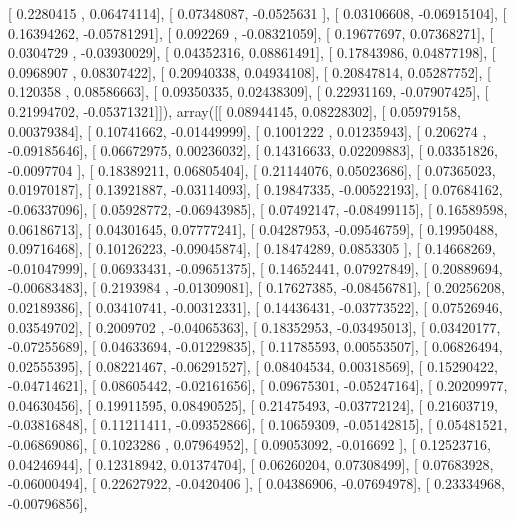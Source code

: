 \documentclass{article}
\begin{document}
       [ 0.2280415 ,  0.06474114],
       [ 0.07348087, -0.0525631 ],
       [ 0.03106608, -0.06915104],
       [ 0.16394262, -0.05781291],
       [ 0.092269  , -0.08321059],
       [ 0.19677697,  0.07368271],
       [ 0.0304729 , -0.03930029],
       [ 0.04352316,  0.08861491],
       [ 0.17843986,  0.04877198],
       [ 0.0968907 ,  0.08307422],
       [ 0.20940338,  0.04934108],
       [ 0.20847814,  0.05287752],
       [ 0.120358  ,  0.08586663],
       [ 0.09350335,  0.02438309],
       [ 0.22931169, -0.07907425],
       [ 0.21994702, -0.05371321]]), array([[ 0.08944145,  0.08228302],
       [ 0.05979158,  0.00379384],
       [ 0.10741662, -0.01449999],
       [ 0.1001222 ,  0.01235943],
       [ 0.206274  , -0.09185646],
       [ 0.06672975,  0.00236032],
       [ 0.14316633,  0.02209883],
       [ 0.03351826, -0.0097704 ],
       [ 0.18389211,  0.06805404],
       [ 0.21144076,  0.05023686],
       [ 0.07365023,  0.01970187],
       [ 0.13921887, -0.03114093],
       [ 0.19847335, -0.00522193],
       [ 0.07684162, -0.06337096],
       [ 0.05928772, -0.06943985],
       [ 0.07492147, -0.08499115],
       [ 0.16589598,  0.06186713],
       [ 0.04301645,  0.07777241],
       [ 0.04287953, -0.09546759],
       [ 0.19950488,  0.09716468],
       [ 0.10126223, -0.09045874],
       [ 0.18474289,  0.0853305 ],
       [ 0.14668269, -0.01047999],
       [ 0.06933431, -0.09651375],
       [ 0.14652441,  0.07927849],
       [ 0.20889694, -0.00683483],
       [ 0.2193984 , -0.01309081],
       [ 0.17627385, -0.08456781],
       [ 0.20256208,  0.02189386],
       [ 0.03410741, -0.00312331],
       [ 0.14436431, -0.03773522],
       [ 0.07526946,  0.03549702],
       [ 0.2009702 , -0.04065363],
       [ 0.18352953, -0.03495013],
       [ 0.03420177, -0.07255689],
       [ 0.04633694, -0.01229835],
       [ 0.11785593,  0.00553507],
       [ 0.06826494,  0.02555395],
       [ 0.08221467, -0.06291527],
       [ 0.08404534,  0.00318569],
       [ 0.15290422, -0.04714621],
       [ 0.08605442, -0.02161656],
       [ 0.09675301, -0.05247164],
       [ 0.20209977,  0.04630456],
       [ 0.19911595,  0.08490525],
       [ 0.21475493, -0.03772124],
       [ 0.21603719, -0.03816848],
       [ 0.11211411, -0.09352866],
       [ 0.10659309, -0.05142815],
       [ 0.05481521, -0.06869086],
       [ 0.1023286 ,  0.07964952],
       [ 0.09053092, -0.016692  ],
       [ 0.12523716,  0.04246944],
       [ 0.12318942,  0.01374704],
       [ 0.06260204,  0.07308499],
       [ 0.07683928, -0.06000494],
       [ 0.22627922, -0.0420406 ],
       [ 0.04386906, -0.07694978],
       [ 0.23334968, -0.00796856],
\end{document}
